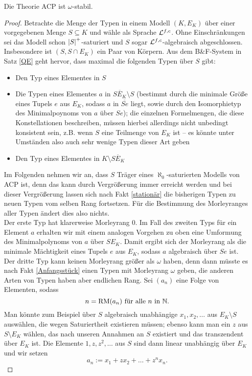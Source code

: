     \begin{theorem}
    	Die Theorie ACP ist $\omega$-stabil.
    \end{theorem}
    \begin{proof}
    	Betrachte die Menge der Typen in einem Modell $(K,E_K)$ über einer vorgegebenen Menge $S\subseteq K$ und wähle als Sprache $\mathcal{L}^{f,c}$. Ohne Einschränkungen sei das Modell schon ${\left| S \right|}^+$-saturiert und $S$ sogar $\mathcal{L}^{f,c}$-algebraisch abgeschlossen. Insbesondere ist $(S,S\cap E_K)$ ein Paar von Körpern. Aus dem B\&F-System in Satz \ref{QE} geht hervor, dass maximal die folgenden Typen über $S$ gibt:
    	\begin{itemize}
    		\item Den Typ eines Elementes in $S$
    		\item Die Typen eines Elementes $a$ in $\overline{SE_K}\setminus S$ (bestimmt durch die minimale Größe eines Tupels $e$ aus $E_K$, sodass $a$ in $\overline{Se}$ liegt, sowie durch den Isomorphietyp des Minimalpoynoms von $a$ über $Se$); die einzelnen Formelmengen, die diese Konstellationen beschreiben, müssen hierbei allerdings nicht unbedingt konsistent sein, z.B. wenn $S$ eine Teilmenge von $E_K$ ist \--- es könnte unter Umständen also auch sehr wenige Typen dieser Art geben
    		\item Den Typ eines Elementes in $K\setminus\overline{SE_K}$
    	\end{itemize}
        Im Folgenden nehmen wir an, dass $S$ Träger eines $\aleph_0$-saturierten Modells von ACP ist, denn das kann durch Vergrößerung immer erreicht werden und bei dieser Vergrößerung lassen sich nach Fakt \ref{stationär} die bisherigen Typen zu neuen Typen vom selben Rang fortsetzen. Für die Bestimmung des Morleyranges aller Typen ändert dies also nichts.\\
        Der erste Typ hat klarerweise Morleyrang 0. Im Fall des zweiten Typs für ein Element $a$ erhalten wir mit einem analogen Vorgehen zu oben eine Umformung des Minimalpolynoms von $a$ über $SE_K$. Damit ergibt sich der Morleyrang als die minimale Mächtigkeit eines Tupels $e$ aus $E_K$, sodass $a$ algebraisch über $Se$ ist.\newpage
        Der dritte Typ kann keinen Morleyrang größer als $\omega$ haben, denn dann müsste es nach Fakt \ref{Anfangsstück} einen Typen mit Morleyrang $\omega$ geben, die anderen Arten von Typen haben aber endlichen Rang. Sei $(a_n)$ eine Folge von Elementen, sodass $$n=\operatorname{RM}(a_n)\text{ für alle }n\text{ in }\mathbb{N}.$$ Man könnte zum Beispiel über $S$ algebraisch unabhängige $x_1,x_2,\dots$ aus $E_K\setminus S$ auswählen, die wegen Saturiertheit existieren müssen; ebenso kann man ein $z$ aus $S\setminus E_K$ wählen, das nach unseren Annahmen an $S$ existiert und das transzendent über $E_K$ ist. Die Elemente $1,z,z^2,\dots$ aus $S$ sind dann linear unabhängig über $E_K$ und wir setzen $$a_n:=x_1+zx_2+\dots+z^nx_n.$$

\end{proof}
